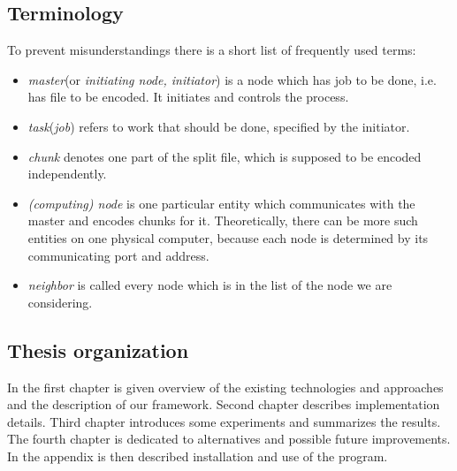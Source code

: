 \subsection*{Terminology}
To prevent misunderstandings there is a short list of frequently used terms:
\begin{itemize}
\item \textit{master}(or \textit{initiating node, initiator}) is a node which has job to be done, i.e. has file to be encoded. It initiates and controls the process.
\item \textit{task}(\textit{job}) refers to work that should be done, specified by the initiator.
\item \textit{chunk} denotes one part of the split file, which is supposed to be encoded independently.
\item \textit{(computing) node} is one particular entity which communicates with the master and encodes chunks for it. Theoretically, there can be more such entities on one physical computer, because each node is determined by its communicating port and address.
\item \textit{neighbor} is called every node which is in the list of the node we are considering.
\end{itemize}

\subsection*{Thesis organization}
In the first chapter is given overview of the existing technologies and approaches and the description of our framework. Second chapter describes implementation details. Third chapter introduces some experiments and summarizes the results. The fourth chapter is dedicated to alternatives and possible future improvements. In the appendix is then described installation and use of the program.
